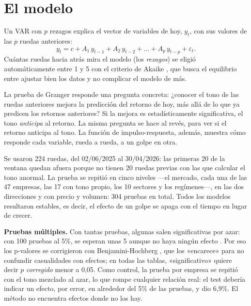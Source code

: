 \section{El modelo}

Un VAR con $p$ rezagos explica el vector de variables de hoy, $y_t$, con sus valores de las $p$
ruedas anteriores:
\begin{equation}
y_t = c + A_1\, y_{t-1} + A_2\, y_{t-2} + \dots + A_p\, y_{t-p} + \varepsilon_t .
\end{equation}
Cuántas ruedas hacia atrás mira el modelo (los \textit{rezagos}) se eligió automáticamente entre
1 y 5 con el criterio de Akaike \citep{lutkepohl2005}, que busca el equilibrio entre ajustar bien
los datos y no complicar el modelo de más.

La prueba de Granger \citep{granger1969} responde una pregunta concreta: ¿conocer el tono de las
ruedas anteriores mejora la predicción del retorno de hoy, más allá de lo que ya predicen los
retornos anteriores? Si la mejora es estadísticamente significativa, el tono \textit{anticipa} al
retorno. La misma pregunta se hace al revés, para ver si el retorno anticipa al tono. La función
de impulso-respuesta, además, muestra cómo responde cada variable, rueda a rueda, a un golpe en
otra.

Se usaron 224 ruedas, del 02/06/2025 al 30/04/2026: las primeras 20 de la ventana quedan afuera
porque no tienen 20 ruedas previas con las que calcular el tono anormal. La prueba se repitió en
cinco niveles —el mercado, cada una de las 47 empresas, las 17 con tono propio, los 10 sectores y
los regímenes—, en las dos direcciones y con precio y volumen: 304 pruebas en total. Todos los
modelos resultaron estables, es decir, el efecto de un golpe se apaga con el tiempo en lugar de
crecer.

\textbf{Pruebas múltiples.} Con tantas pruebas, algunas salen significativas por azar: con 100
pruebas al 5\%, se esperan unas 5 aunque no haya ningún efecto \citep{harvey2016}. Por eso los
p-valores se corrigieron con Benjamini-Hochberg \citep{bh1995}, que los «encarece» para no
confundir casualidades con efectos; en todas las tablas, «significativo» quiere decir $p$
\textit{corregido} menor a 0,05. Como control, la prueba por empresa se repitió con el tono
mezclado al azar, lo que rompe cualquier relación real: el test debería indicar un efecto, por
error, en alrededor del 5\% de las pruebas, y dio 6,9\%. El método no encuentra efectos donde no
los hay.

